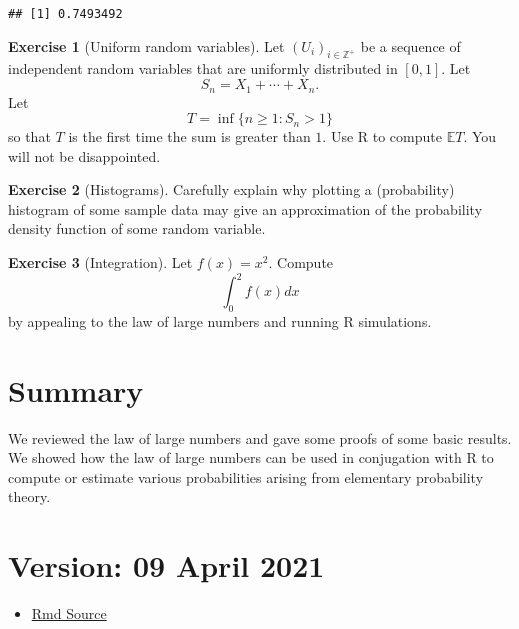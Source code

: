 \documentclass[
]{article}
\providecommand{\tightlist}{%
  \setlength{\itemsep}{0pt}\setlength{\parskip}{0pt}}
\theoremstyle{definition}
\theoremstyle{definition}
\theoremstyle{definition}
\newtheorem{exercise}{Exercise}[section]
\theoremstyle{remark}
\begin{document}
\begin{verbatim}
## [1] 0.7493492
\end{verbatim}

\begin{exercise}[Uniform random variables]
\protect\hypertarget{exr:unnamed-chunk-15}{}{\label{exr:unnamed-chunk-15} \iffalse (Uniform random variables) \fi{} }Let \((U_i)_{i \in \mathbb{Z} ^+}\) be a sequence of independent random variables that are uniformly distributed in \([0,1]\). Let
\[S_n = X_1 + \cdots + X_n.\]
Let \[T = \inf\{n \geq 1:  S_n >1\}\]
so that \(T\) is the first time the sum is greater than \(1\). Use R to compute \(\mathbb{E} T\). You will not be disappointed.
\end{exercise}
\begin{exercise}[Histograms]
\protect\hypertarget{exr:unnamed-chunk-16}{}{\label{exr:unnamed-chunk-16} \iffalse (Histograms) \fi{} }Carefully explain why plotting a (probability) histogram of some sample data may give an approximation of the probability density function of some random variable.
\end{exercise}

\begin{exercise}[Integration]
\protect\hypertarget{exr:unnamed-chunk-17}{}{\label{exr:unnamed-chunk-17} \iffalse (Integration) \fi{} }Let \(f(x) = x^2\). Compute
\[ \int_0 ^2 f(x)dx\]
by appealing to the law of large numbers and running R simulations.
\end{exercise}

\hypertarget{summary}{%
\section{Summary}\label{summary}}

We reviewed the law of large numbers and gave some proofs of some basic results. We showed how the law of large numbers can be used in conjugation with R to compute or estimate various probabilities arising from elementary probability theory.

\hypertarget{version-09-april-2021}{%
\section{Version: 09 April 2021}\label{version-09-april-2021}}

\begin{itemize}
\tightlist
\item
  \href{https://tsoo-math.github.io/ucl/prob-viaR.Rmd}{Rmd Source}
\end{itemize}
\end{document}
